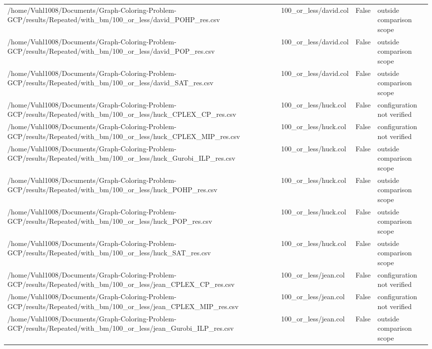 \begin{table}[htbp]
\begin{tabular}{llll}
/home/Vuhl1008/Documents/Graph-Coloring-Problem-GCP/results/Repeated/with\_bm/100\_or\_less/david\_POHP\_res.csv & 100\_or\_less/david.col & False & outside comparison scope \\
/home/Vuhl1008/Documents/Graph-Coloring-Problem-GCP/results/Repeated/with\_bm/100\_or\_less/david\_POP\_res.csv & 100\_or\_less/david.col & False & outside comparison scope \\
/home/Vuhl1008/Documents/Graph-Coloring-Problem-GCP/results/Repeated/with\_bm/100\_or\_less/david\_SAT\_res.csv & 100\_or\_less/david.col & False & outside comparison scope \\
/home/Vuhl1008/Documents/Graph-Coloring-Problem-GCP/results/Repeated/with\_bm/100\_or\_less/huck\_CPLEX\_CP\_res.csv & 100\_or\_less/huck.col & False & configuration not verified \\
/home/Vuhl1008/Documents/Graph-Coloring-Problem-GCP/results/Repeated/with\_bm/100\_or\_less/huck\_CPLEX\_MIP\_res.csv & 100\_or\_less/huck.col & False & configuration not verified \\
/home/Vuhl1008/Documents/Graph-Coloring-Problem-GCP/results/Repeated/with\_bm/100\_or\_less/huck\_Gurobi\_ILP\_res.csv & 100\_or\_less/huck.col & False & outside comparison scope \\
/home/Vuhl1008/Documents/Graph-Coloring-Problem-GCP/results/Repeated/with\_bm/100\_or\_less/huck\_POHP\_res.csv & 100\_or\_less/huck.col & False & outside comparison scope \\
/home/Vuhl1008/Documents/Graph-Coloring-Problem-GCP/results/Repeated/with\_bm/100\_or\_less/huck\_POP\_res.csv & 100\_or\_less/huck.col & False & outside comparison scope \\
/home/Vuhl1008/Documents/Graph-Coloring-Problem-GCP/results/Repeated/with\_bm/100\_or\_less/huck\_SAT\_res.csv & 100\_or\_less/huck.col & False & outside comparison scope \\
/home/Vuhl1008/Documents/Graph-Coloring-Problem-GCP/results/Repeated/with\_bm/100\_or\_less/jean\_CPLEX\_CP\_res.csv & 100\_or\_less/jean.col & False & configuration not verified \\
/home/Vuhl1008/Documents/Graph-Coloring-Problem-GCP/results/Repeated/with\_bm/100\_or\_less/jean\_CPLEX\_MIP\_res.csv & 100\_or\_less/jean.col & False & configuration not verified \\
/home/Vuhl1008/Documents/Graph-Coloring-Problem-GCP/results/Repeated/with\_bm/100\_or\_less/jean\_Gurobi\_ILP\_res.csv & 100\_or\_less/jean.col & False & outside comparison scope \\

\end{tabular}
\end{table}
